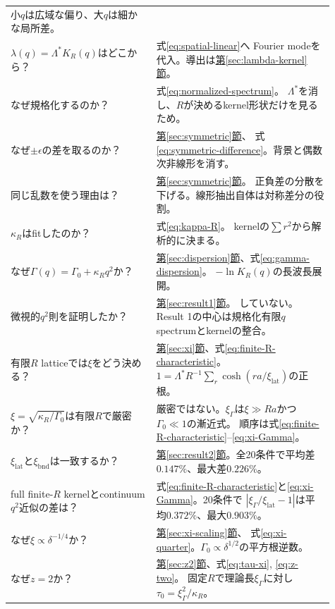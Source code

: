 \documentclass[a4paper,12pt]{ltjsarticle}
\newcommand{\bnd}{\mathrm{bnd}}
\begin{document}
\begin{longtable}{p{0.41\linewidth}p{0.50\linewidth}}
小$q$は広域な偏り、大$q$は細かな局所差。 \\
$\lambda(q)=\Lambda^*K_R(q)$はどこから？ & 式\eqref{eq:spatial-linear}へ
Fourier modeを代入。導出は\hyperref[sec:lambda-kernel]{第\ref*{sec:lambda-kernel}節}。 \\
なぜ規格化するのか？ & 式\eqref{eq:normalized-spectrum}。
$\Lambda^*$を消し、$R$が決めるkernel形状だけを見るため。 \\
なぜ$\pm\epsilon$の差を取るのか？ & \hyperref[sec:symmetric]{第\ref*{sec:symmetric}節}、
式\eqref{eq:symmetric-difference}。背景と偶数次非線形を消す。 \\
同じ乱数を使う理由は？ & \hyperref[sec:symmetric]{第\ref*{sec:symmetric}節}。
正負差の分散を下げる。線形抽出自体は対称差分の役割。 \\
$\kappa_R$はfitしたのか？ & 式\eqref{eq:kappa-R}。
kernelの$\sum r^2$から解析的に決まる。 \\
なぜ$\Gamma(q)=\Gamma_0+\kappa_Rq^2$か？ &
\hyperref[sec:dispersion]{第\ref*{sec:dispersion}節}、式\eqref{eq:gamma-dispersion}。
$-\ln K_R(q)$の長波長展開。 \\
微視的$q^2$則を証明したか？ & \hyperref[sec:result1]{第\ref*{sec:result1}節}。
していない。Result 1の中心は規格化有限$q$ spectrumとkernelの整合。 \\
有限$R$ latticeでは$\xi$をどう決める？ &
\hyperref[sec:xi]{第\ref*{sec:xi}節}、式\eqref{eq:finite-R-characteristic}。
$1=\Lambda^*R^{-1}\sum_r\cosh(ra/\xi_{\mathrm{lat}})$の正根。 \\
$\xi=\sqrt{\kappa_R/\Gamma_0}$は有限$R$で厳密か？ &
厳密ではない。$\xi_{\Gamma}$は$\xi\gg Ra$かつ$\Gamma_0\ll1$の漸近式。
順序は式\eqref{eq:finite-R-characteristic}--\eqref{eq:xi-Gamma}。 \\
$\xi_{\mathrm{lat}}$と$\xi_{\bnd}$は一致するか？ &
\hyperref[sec:result2]{第\ref*{sec:result2}節}。全20条件で平均差$0.147\%$、最大差$0.226\%$。 \\
full finite-$R$ kernelとcontinuum $q^2$近似の差は？ &
式\eqref{eq:finite-R-characteristic}と\eqref{eq:xi-Gamma}。20条件で
$|\xi_{\Gamma}/\xi_{\mathrm{lat}}-1|$は平均$0.372\%$、最大$0.903\%$。 \\
なぜ$\xi\propto\delta^{-1/4}$か？ & \hyperref[sec:xi-scaling]{第\ref*{sec:xi-scaling}節}、
式\eqref{eq:xi-quarter}。$\Gamma_0\propto\delta^{1/2}$の平方根逆数。 \\
なぜ$z=2$か？ & \hyperref[sec:z2]{第\ref*{sec:z2}節}、式\eqref{eq:tau-xi}, \eqref{eq:z-two}。
固定$R$で理論長$\xi_{\Gamma}$に対し$\tau_0=\xi_{\Gamma}^2/\kappa_R$。 \\

\end{longtable}
\end{document}
